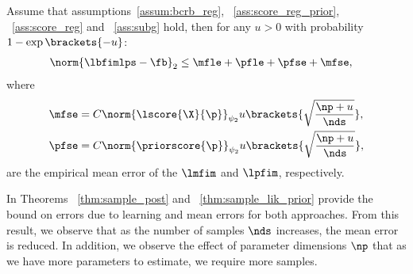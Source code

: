 \begin{theorem}\label{thm:sample_lik_prior}
    Assume that assumptions~\ref{assum:bcrb_reg}, ~\ref{ass:score_reg_prior}, ~\ref{ass:score_reg} and ~\ref{ass:subg} hold, then for any $u>0$ with probability $1-\exp{\brackets{-u}}$:
    \begin{align}\label{eq:error_lik_prior_lrn_mean}
        &\norm{\lbfimlps-\fb}_2\leq \mfle+\pfle+\pfse+\mfse,
    \end{align}
    where
    \begin{subequations}
        \begin{align}
            &\mfse=C\norm{\lscore{\X}{\p}}_{\psi_2}u\brackets{\sqrt{\frac{\np+u}{\nds}}}, \nonumber\\
        &\pfse=C\norm{\priorscore{\p}}_{\psi_2}u\brackets{\sqrt{\frac{\np+u}{\nds}}},\nonumber    
        \end{align}
    \end{subequations}
    are the empirical mean error of the $\lmfim$ and $\lpfim$, respectively. 
\end{theorem}
In Theorems ~\ref{thm:sample_post} and ~\ref{thm:sample_lik_prior} provide the bound on \name{} errors due to learning and mean errors for both approaches. 
From this result, we observe that as the number of samples $\nds$ increases, the mean error is reduced. In addition, we observe the effect of parameter dimensions $\np$ that as we have more parameters to estimate, we require more samples.
